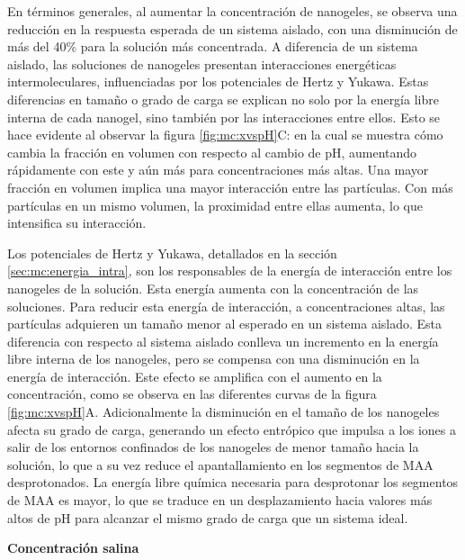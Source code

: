 	En t\'erminos generales, al aumentar la concentraci\'on de nanogeles, se observa una reducci\'on en la respuesta esperada de un sistema aislado, con una disminuci\'on de m\'as del 40\% para la soluci\'on m\'as concentrada. A diferencia de un sistema aislado, las soluciones de nanogeles presentan interacciones energ\'eticas intermoleculares, influenciadas por los potenciales de Hertz y Yukawa. Estas diferencias en tama\~no o grado de carga se explican no solo por la energ\'ia libre interna de cada nanogel, sino tambi\'en por las interacciones entre ellos. Esto se hace evidente al observar la figura \ref{fig:mc:xvspH}C: en la cual se muestra c\'omo cambia la fracci\'on en volumen con respecto al cambio de pH, aumentando r\'apidamente con este y a\'un m\'as para concentraciones m\'as altas. Una mayor fracci\'on en volumen implica una mayor interacci\'on entre las part\'iculas. Con m\'as part\'iculas en un mismo volumen, la proximidad entre ellas aumenta, lo que intensifica su interacci\'on.
	
	Los potenciales de Hertz y Yukawa, detallados en la secci\'on \ref{sec:mc:energia_intra}, son los responsables de la energ\'ia de interacci\'on entre los nanogeles de la soluci\'on. Esta energ\'ia aumenta con la concentraci\'on de las soluciones.
	Para reducir esta energ\'ia de interacci\'on, a concentraciones altas,  las part\'iculas adquieren un tama\~no menor al esperado en un sistema aislado. Esta diferencia con respecto al sistema aislado conlleva un incremento en la energ\'ia libre interna de los nanogeles, pero se compensa con una disminuci\'on en la energ\'ia de interacci\'on. Este efecto se amplifica con el aumento en la concentraci\'on, como se observa en las diferentes curvas de la figura \ref{fig:mc:xvspH}A. 
	Adicionalmente la disminuci\'on en el tama\~no de los nanogeles afecta su grado de carga, generando un efecto entr\'opico que impulsa a los iones a salir de los entornos confinados de los nanogeles de menor tama\~no hacia la soluci\'on, lo que a su vez reduce el apantallamiento en los segmentos de MAA desprotonados. La energ\'ia libre qu\'imica necesaria para desprotonar los segmentos de MAA es mayor, lo que se traduce en un desplazamiento hacia valores m\'as altos de pH para alcanzar el mismo grado de carga que un sistema ideal.
	
	\textbf{Concentraci\'on salina}
	
